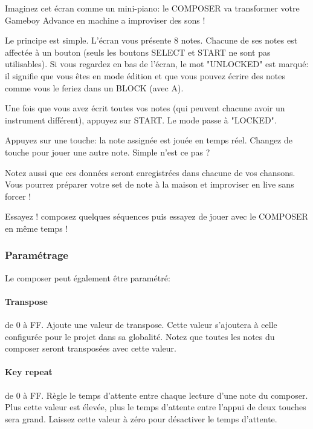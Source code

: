 \documentclass[12pt,a4paper]{article}
\begin{document}
    Imaginez cet écran comme un mini-piano: le COMPOSER va transformer votre Gameboy Advance en machine a improviser des sons !
    
    
    Le principe est simple. L'écran vous présente 8 notes. Chacune de ses notes est affectée à un bouton (seuls les boutons SELECT et START ne sont pas utilisables). Si vous regardez en bas de l'écran, le mot "UNLOCKED" est marqué: il signifie que vous êtes en mode édition et que vous pouvez écrire des notes comme vous le feriez dans un BLOCK (avec A). \medskip
    
    Une fois que vous avez écrit toutes vos notes (qui peuvent chacune avoir un instrument différent), appuyez sur START. Le mode passe à "LOCKED".\medskip
    
    Appuyez sur une touche: la note assignée est jouée en temps réel. Changez de touche pour jouer une autre note. Simple n'est ce pas ?\medskip
    
    Notez aussi que ces données seront enregistrées dans chacune de vos chansons. Vous pourrez préparer votre set de note à la maison et improviser en live sans forcer !\medskip
    
    Essayez ! composez quelques séquences puis essayez de jouer avec le COMPOSER en même temps !\medskip
    
    \subsubsection{Paramétrage}
    
    Le composer peut également être paramétré:
    
    
        \paragraph{Transpose} de 0 à FF. Ajoute une valeur de transpose. Cette valeur s'ajoutera à celle configurée pour le projet dans sa globalité. Notez que toutes les notes du composer seront transposées avec cette valeur.
        
        \paragraph{Key repeat} de 0 à FF. Règle le temps d'attente entre chaque lecture d'une note du composer. Plus cette valeur est élevée, plus le temps d'attente entre l'appui de deux touches sera grand. Laissez cette valeur à zéro pour désactiver le temps d'attente.
    
\end{document}
